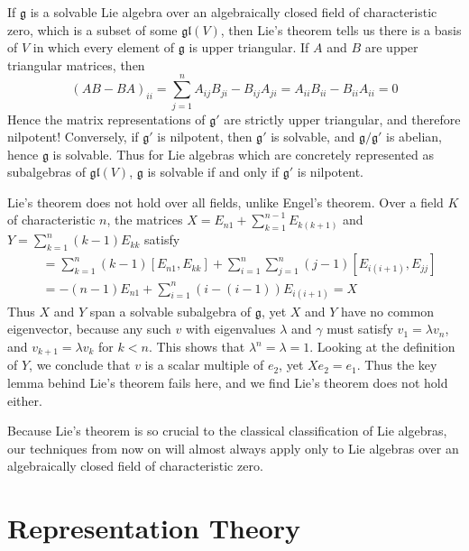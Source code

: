 If $\mathfrak{g}$ is a solvable Lie algebra over an algebraically closed field of characteristic zero, which is a subset of some $\mathfrak{gl}(V)$, then Lie's theorem tells us there is a basis of $V$ in which every element of $\mathfrak{g}$ is upper triangular. If $A$ and $B$ are upper triangular matrices, then
%
\[ (AB - BA)_{ii} = \sum_{j = 1}^n A_{ij}B_{ji} - B_{ij}A_{ji} = A_{ii}B_{ii} - B_{ii}A_{ii} = 0 \]
%
Hence the matrix representations of $\mathfrak{g}'$ are strictly upper triangular, and therefore nilpotent! Conversely, if $\mathfrak{g}'$ is nilpotent, then $\mathfrak{g}'$ is solvable, and $\mathfrak{g}/\mathfrak{g}'$ is abelian, hence $\mathfrak{g}$ is solvable. Thus for Lie algebras which are concretely represented as subalgebras of $\mathfrak{gl}(V)$, $\mathfrak{g}$ is solvable if and only if $\mathfrak{g}'$ is nilpotent.

Lie's theorem does not hold over all fields, unlike Engel's theorem. Over a field $K$ of characteristic $n$, the matrices $X = E_{n1} + \sum_{k = 1}^{n-1} E_{k(k+1)}$ and $Y = \sum_{k = 1}^n (k-1) E_{kk}$ satisfy
%
\begin{align*}
    [X,Y] &= \sum_{k = 1}^n (k-1) [E_{n1}, E_{kk}] + \sum_{i = 1}^n \sum_{j = 1}^n (j-1) [E_{i(i+1)}, E_{jj}]\\
    &= -(n-1) E_{n1} + \sum_{i = 1}^n (i - (i-1)) E_{i(i+1)} = X
\end{align*}
%
Thus $X$ and $Y$ span a solvable subalgebra of $\mathfrak{g}$, yet $X$ and $Y$ have no common eigenvector, because any such $v$ with eigenvalues $\lambda$ and $\gamma$ must satisfy $v_1 = \lambda v_n$, and $v_{k+1} = \lambda v_k$ for $k < n$. This shows that $\lambda^n = \lambda = 1$. Looking at the definition of $Y$, we conclude that $v$ is a scalar multiple of $e_2$, yet $Xe_2 = e_1$. Thus the key lemma behind Lie's theorem fails here, and we find Lie's theorem does not hold either.

Because Lie's theorem is so crucial to the classical classification of Lie algebras, our techniques from now on will almost always apply only to Lie algebras over an algebraically closed field of characteristic zero.

\section{Representation Theory}

